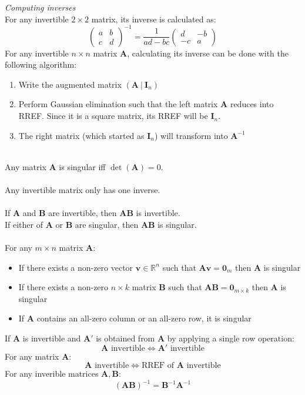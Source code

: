 \documentclass{scrartcl}
\newcommand{\R}{\mathbb{R}}
\renewcommand{\vec}[1]{\mathbf{#1}}
\begin{document}
\textit{Computing inverses}
\\
For any invertible $ 2 \times 2 $ matrix, its inverse is calculated as:
\begin{equation}
\begin{pmatrix}
a & b \\ c & d
\end{pmatrix}^{-	1}
=
\frac{1}{ad-bc} \begin{pmatrix}
d & -b \\ -c & a
\end{pmatrix}
\end{equation}
For any invertible $ n \times n $ matrix $ \vec{A} $, calculating its inverse can be done with the following algorithm:
\begin{enumerate}
\item Write the augmented matrix $ (\vec{A} \ | \ \vec{I}_{n}) $
\item Perform Gaussian elimination such that the left matrix $ \vec{A} $ reduces into RREF. Since it is a square matrix, its RREF will be $ \vec{I}_{n} $.
\item The right matrix (which started as $ \vec{I}_{n} $) will transform into $ \vec{A}^{-1} $
\end{enumerate}
\noindent
\\
Any matrix $ \vec{A} $ is singular iff $ \det (\vec{A}) = 0 $.
\\\\
Any invertible matrix only has one inverse.
\\\\
If $ \vec{A} $ and $ \vec{B} $ are invertible, then $ \vec{AB} $ is invertible.
\\
If either of $ \vec{A} $ or $ \vec{B} $ are singular, then $ \vec{AB} $ is singular.
\\\\
For any $ m \times n $ matrix $ \vec{A} $:
\begin{itemize}
\item If there exists a non-zero vector $ \vec{v} \in \R^{n} $ such that $ \vec{Av} = \vec{0}_{m} $ then $ \vec{A} $ is singular
\item If there exists a non-zero $ n \times k $ matrix $ \vec{B} $ such that $ \vec{AB} = \vec{0}_{m \times k} $ then $ \vec{A} $ is singular
\item If $ \vec{A} $ contains an all-zero column or an all-zero row, it is singular
\end{itemize}
If $ \vec{A} $ is invertible and $ \vec{A}' $ is obtained from $ \vec{A} $ by applying a single row operation:
\begin{equation}
\vec{A} \textrm{ invertible} \Leftrightarrow \vec{A}' \textrm{ invertible}
\end{equation}
For any matrix $ \vec{A} $:
\begin{equation}
\vec{A} \textrm{ invertible} \Leftrightarrow \textrm{RREF of } \vec{A} \textrm{ invertible}
\end{equation}
For any inverible matrices $ \vec{A}, \vec{B} $:
\begin{equation}
(\vec{AB})^{-1} = \vec{B}^{-1} \vec{A}^{-1}
\end{equation}
\end{document}
